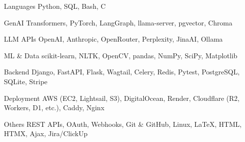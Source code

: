 


\begin{cvskills}

\cvskill
    {Languages} %
    {Python, SQL, Bash, C} %

\cvskill
    {GenAI} %
    {Transformers, PyTorch, LangGraph, llama-server, pgvector, Chroma} %

\cvskill
    {LLM APIs} %
    {OpenAI, Anthropic, OpenRouter, Perplexity, JinaAI, Ollama} %

\cvskill
    {ML \& Data} %
    {scikit-learn, NLTK, OpenCV, pandas, NumPy, SciPy, Matplotlib} %

\cvskill
    {Backend} %
    {Django, FastAPI, Flask, Wagtail, Celery, Redis, Pytest, PostgreSQL, SQLite, Stripe} %

\cvskill
    {Deployment} %
    {AWS (EC2, Lightsail, S3), DigitalOcean, Render, Cloudflare (R2, Workers, D1, etc.), Caddy, Nginx} %

\cvskill
    {Others} %
    {REST APIs, OAuth, Webhooks, Git \& GitHub, Linux, LaTeX, HTML, HTMX, Ajax, Jira/ClickUp} %

\end{cvskills}
